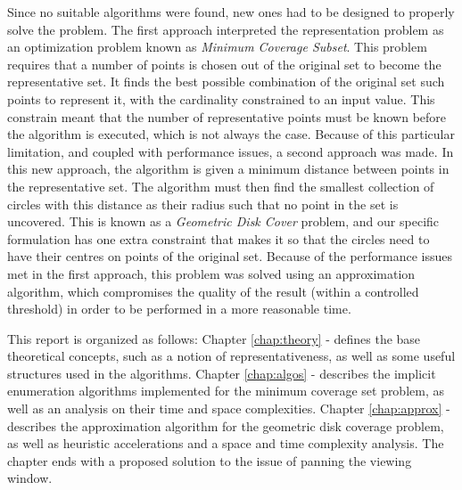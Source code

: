 Since no suitable algorithms were found, new ones had to be designed to properly solve the problem. The first approach interpreted the representation problem as an optimization problem known as \emph{Minimum Coverage Subset}. This problem requires that a number of points is chosen out of the original set to become the representative set. It finds the best possible combination of the original set such points to represent it, with the cardinality constrained to an input value. This constrain meant that the number of representative points must be known before the algorithm is executed, which is not always the case. Because of this particular limitation, and coupled with performance issues, a second approach was made. In this new approach, the algorithm is given a minimum distance between points in the representative set. The algorithm must then find the smallest collection of circles with this distance as their radius such that no point in the set is uncovered. This is known as a \emph{Geometric Disk Cover} problem, and our specific formulation has one extra constraint that makes it so that the circles need to have their centres on points of the original set. Because of the performance issues met in the first approach, this problem was solved using an approximation algorithm, which compromises the quality of the result (within a controlled threshold) in order to be performed in a more reasonable time. 

This report is organized as follows:
Chapter \ref{chap:theory} -  defines the base theoretical concepts, such as a notion of representativeness, as well as some useful structures used in the algorithms. Chapter \ref{chap:algos} -  describes the implicit enumeration algorithms implemented for the minimum coverage set problem, as well as an analysis on their time and space complexities. Chapter \ref{chap:approx} -  describes the approximation algorithm for the geometric disk coverage problem, as well as heuristic accelerations and a space and time complexity analysis. The chapter ends with a proposed solution to the issue of panning the viewing window.